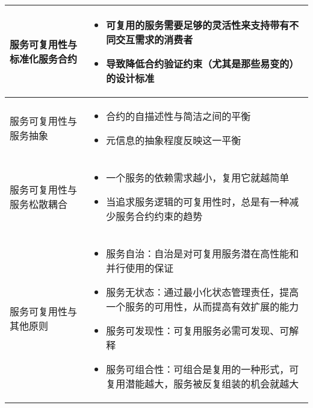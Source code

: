 \begin{longtable}{|m{3cm}<{\centering}|m{12cm}|}
    \hline
    服务可复用性与标准化服务合约
    & 
    \vspace{-1.3em}
    \begin{itemize}[leftmargin=1.5em,itemsep=-3pt,topsep=-3pt]
        \item 可复用的服务需要足够的灵活性来支持带有不同交互需求的消费者
        \item 导致降低合约验证约束（尤其是那些易变的）的设计标准
    \vspace{-1.5em}
    \end{itemize}  
    \\ \hline
    服务可复用性与服务抽象
    & 
    \vspace{-1.3em}
    \begin{itemize}[leftmargin=1.5em,itemsep=-3pt,topsep=-3pt]
        \item 合约的自描述性与简洁之间的平衡
        \item 元信息的抽象程度反映这一平衡 
    \vspace{-1.5em}
    \end{itemize}  
    \\ \hline
    服务可复用性与服务松散耦合
    & 
    \vspace{-1.3em}
    \begin{itemize}[leftmargin=1.5em,itemsep=-3pt,topsep=-3pt]
        \item 一个服务的依赖需求越小，复用它就越简单
        \item 当追求服务逻辑的可复用性时，总是有一种减少服务合约约束的趋势
    \vspace{-1.5em}
    \end{itemize}  
    \\ \hline
    服务可复用性与其他原则
    & 
    \vspace{-1.3em}
    \begin{itemize}[leftmargin=1.5em,itemsep=-3pt,topsep=-3pt]
        \item 服务自治：自治是对可复用服务潜在高性能和并行使用的保证
        \item 服务无状态：通过最小化状态管理责任，提高一个服务的可用性，从而提高有效扩展的能力
        \item 服务可发现性：可复用服务必需可发现、可解释
        \item 服务可组合性：可组合是复用的一种形式，可复用潜能越大，服务被反复组装的机会就越大 
    \vspace{-1.5em}
    \end{itemize}  
    \\ \hline
\end{longtable}